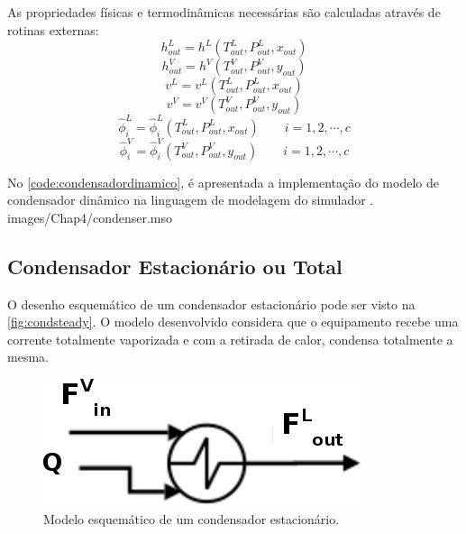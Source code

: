 As propriedades físicas e termodinâmicas necessárias são calculadas através de rotinas externas:
\begin{equation}
h_{out}^L = h^L(T_{out}^L, P_{out}^L, x_{out})
\end{equation}
\begin{equation}
h_{out}^V = h^V(T_{out}^V, P_{out}^V, y_{out})
\end{equation}
\begin{equation}
v^L = v^L(T_{out}^L, P_{out}^L, x_{out})
\end{equation}
\begin{equation}
v^V = v^V(T_{out}^V, P_{out}^V, y_{out})
\end{equation}
\begin{equation}
\hat{\phi}_i^L = \hat{\phi}_i^L(T_{out}^L, P_{out}^L, x_{out})  \qquad
i=1,2,\cdots,c
\end{equation}
\begin{equation}
\hat{\phi}_i^V = \hat{\phi}_i^V(T_{out}^V, P_{out}^V, y_{out})  \qquad
i=1,2,\cdots,c
\end{equation}

No \autoref{code:condensadordinamico}, é apresentada a implementação do modelo de condensador dinâmico na linguagem de
modelagem do simulador \emso.
 {images/Chap4/condenser.mso}

\subsection{Condensador Estacionário ou Total} \label{sec:modelocondensadorestacionario}
O desenho esquemático de um condensador estacionário pode ser visto na \autoref{fig:condsteady}. O modelo desenvolvido
considera que o equipamento recebe uma corrente totalmente vaporizada e com a retirada de calor, condensa totalmente a
mesma.
\begin{figure}[htb]
\centering \includegraphics[scale=0.5]{images/Chap3/esquemacondensersteady2.png}
\caption{Modelo esquemático de um condensador estacionário.}
\label{fig:condsteady}
\end{figure}

